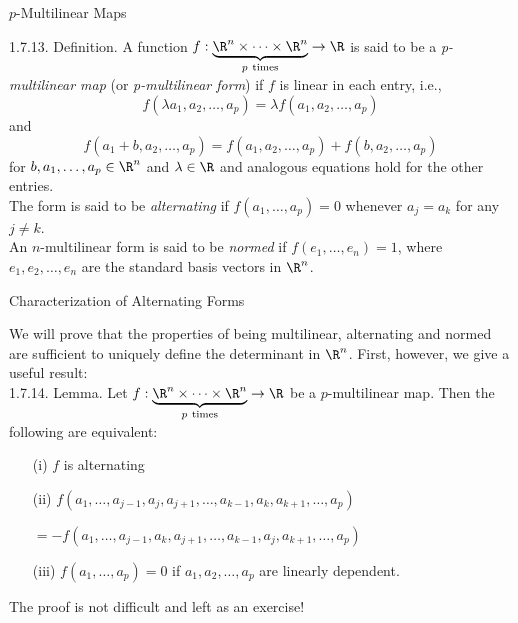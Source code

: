 \documentclass[smaller,hyperref={CJKbookmarks=true}]{beamer}
\newcommand{\myseries}[2]{$#1_1,#1_2,\dots,#1_#2$}
\begin{document}
\begin{frame}[t,shrink]{$p$-Multilinear Maps}
\begin{spacing}{1.05}
\alert{1.7.13. Definition.} A function $f:\underbrace{\R^n\times\cdots\times\R^n}_{p ~\text{times}}\to\R$ is said to be a \emph{p-multilinear map} (or \emph{p-multilinear form}) if $f$ is linear in each entry, i.e.,
\[f(\lambda a_1,a_2,\ldots,a_p)=\lambda f(a_1,a_2,\ldots,a_p)\]
and
\[f(a_1+b,a_2,\ldots,a_p)=f(a_1,a_2,\ldots,a_p)+f(b,a_2,\ldots,a_p)\]
for $b,a_1,\ldots,a_p\in\R^n$ and $\lambda\in\R$ and analogous equations hold for the other entries.\\[7pt]
The form is said to be \emph{alternating} if $f(a_1,\ldots,a_p)=0$ whenever $a_j=a_k$ for any $j\neq k$.\\
An $n$-multilinear form is said to be \emph{normed} if $f(e_1,\ldots,e_n)=1$, where \myseries{e}{n} are the standard basis vectors in $\R^n$.
\end{spacing}
\end{frame}
\begin{frame}[c]{Characterization of Alternating Forms}
\begin{spacing}{1.05}
We will prove that the properties of being multilinear, alternating and
normed are suf{}ficient to uniquely define the determinant in $\R^n$. First, however, we give a useful result:\\[5pt]
\alert{1.7.14. Lemma.} Let $f:\underbrace{\R^n\times\cdots\times\R^n}_{p ~\text{times}}\to\R$ be a $p$-multilinear map. Then the following are equivalent:
\begin{itemize}
  \item[(i)] $f$ is alternating
  \item[(ii)] $f(a_1,\ldots,a_{j-1},a_j,a_{j+1},\ldots,a_{k-1},a_k,a_{k+1},\ldots,a_p)$\\ \begin{flushright}
         $=-f(a_1,\ldots,a_{j-1},a_k,a_{j+1},\ldots,a_{k-1},a_j,a_{k+1},\ldots,a_p)$
      \end{flushright}
  \item[(iii)] $f(a_1,\ldots,a_p)=0$ if \myseries{a}{p} are linearly dependent.
\end{itemize}
The proof is not dif{}ficult and left as an exercise!
\end{spacing}
\end{frame}
\end{document}
